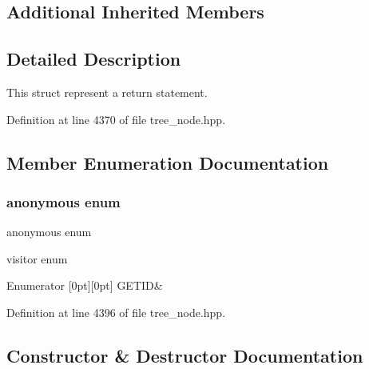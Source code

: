 \subsection*{Additional Inherited Members}


\subsection{Detailed Description}
This struct represent a \textquotesingle{}return\textquotesingle{} statement. 

Definition at line 4370 of file tree\+\_\+node.\+hpp.



\subsection{Member Enumeration Documentation}
\mbox{\label{structreturn__stmt_ad47dc9233209e6849b40ffe4dc73405b}} 
\subsubsection{\texorpdfstring{anonymous enum}{anonymous enum}}
{\footnotesize\ttfamily anonymous enum}



visitor enum 

\begin{DoxyEnumFields}{Enumerator}
[0pt][0pt]{}\mbox{\label{structreturn__stmt_ad47dc9233209e6849b40ffe4dc73405bab036a658eba4cc422564c6f978c74af7}} 
G\+E\+T\+ID&\\
\hline

\end{DoxyEnumFields}


Definition at line 4396 of file tree\+\_\+node.\+hpp.



\subsection{Constructor \& Destructor Documentation}
\mbox{\label{structreturn__stmt_a7ef2412ec713ad049d8260b4e97d1732}} 
